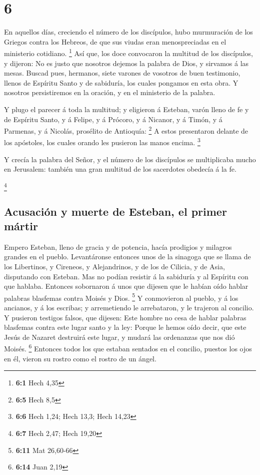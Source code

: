 \hypertarget{section-5}{%
\section{6}\label{section-5}}

 En aquellos días, creciendo el número de los discípulos,
hubo murmuración de los Griegos contra los Hebreos, de que sus viudas
eran menospreciadas en el ministerio cotidiano. \footnote{\textbf{6:1}
  Hech 4,35}  Así que, los doce convocaron la multitud de
los discípulos, y dijeron: No es justo que nosotros dejemos la palabra
de Dios, y sirvamos á las mesas.  Buscad pues, hermanos,
siete varones de vosotros de buen testimonio, llenos de Espíritu Santo y
de sabiduría, los cuales pongamos en esta obra.  Y nosotros
persistiremos en la oración, y en el ministerio de la palabra.

 Y plugo el parecer á toda la multitud; y eligieron á
Esteban, varón lleno de fe y de Espíritu Santo, y á Felipe, y á Prócoro,
y á Nicanor, y á Timón, y á Parmenas, y á Nicolás, prosélito de
Antioquía: \footnote{\textbf{6:5} Hech 8,5}  A estos
presentaron delante de los apóstoles, los cuales orando les pusieron las
manos encima. \footnote{\textbf{6:6} Hech 1,24; Hech 13,3; Hech 14,23}

 Y crecía la palabra del Señor, y el número de los
discípulos se multiplicaba mucho en Jerusalem: también una gran multitud
de los sacerdotes obedecía á la fe.

\footnote{\textbf{6:7} Hech 2,47; Hech 19,20}

\hypertarget{acusaciuxf3n-y-muerte-de-esteban-el-primer-muxe1rtir}{%
\subsection{Acusación y muerte de Esteban, el primer
mártir}\label{acusaciuxf3n-y-muerte-de-esteban-el-primer-muxe1rtir}}

 Empero Esteban, lleno de gracia y de potencia, hacía
prodigios y milagros grandes en el pueblo.  Levantáronse
entonces unos de la sinagoga que se llama de los Libertinos, y Cireneos,
y Alejandrinos, y de los de Cilicia, y de Asia, disputando con Esteban.
 Mas no podían resistir á la sabiduría y al Espíritu con
que hablaba.  Entonces sobornaron á unos que dijesen que le
habían oído hablar palabras blasfemas contra Moisés y Dios. \footnote{\textbf{6:11}
  Mat 26,60-66}  Y conmovieron al pueblo, y á los ancianos,
y á los escribas; y arremetiendo le arrebataron, y le trajeron al
concilio.  Y pusieron testigos falsos, que dijesen: Este
hombre no cesa de hablar palabras blasfemas contra este lugar santo y la
ley:  Porque le hemos oído decir, que este Jesús de Nazaret
destruirá este lugar, y mudará las ordenanzas que nos dió Moisés.
\footnote{\textbf{6:14} Juan 2,19}  Entonces todos los que
estaban sentados en el concilio, puestos los ojos en él, vieron su
rostro como el rostro de un ángel.


